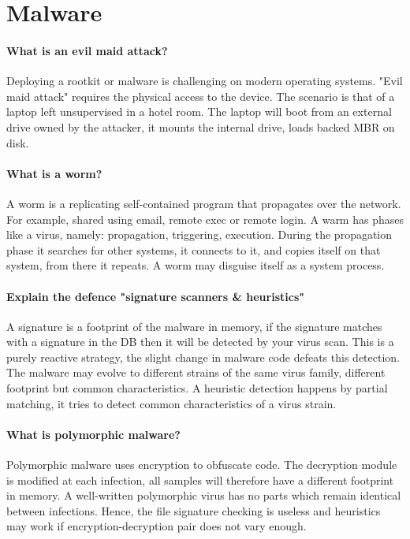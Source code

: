 \section{Malware}
\paragraph{What is an evil maid attack?}
Deploying a rootkit or malware is challenging on modern operating systems. "Evil maid attack" requires the physical access to the device. The scenario is that of a laptop left unsupervised in a hotel room. The laptop will boot from an external drive owned by the attacker, it mounts the internal drive, loads backed MBR on disk. 

\paragraph{What is a worm?}
A worm is a replicating self-contained program that propagates over the network. For example, shared using email, remote exec or remote login. A warm has phases like a virus, namely: propagation, triggering, execution. During the propagation phase it searches for other systems, it connects to it, and copies itself on that system, from there it repeats. A worm may disguise itself as a system process.

\paragraph{Explain the defence "signature scanners \& heuristics"}
A signature is a footprint of the malware in memory, if the signature matches with a signature in the DB then it will be detected by your virus scan. This is a purely reactive strategy, the slight change in malware code defeats this detection. The malware may evolve to different strains of the same virus family, different footprint but common characteristics. A heuristic detection happens by partial matching, it tries to detect common characteristics of a virus strain.

\paragraph{What is polymorphic malware?}
Polymorphic malware uses encryption to obfuscate code. The decryption module is modified at each infection, all samples will therefore have a different footprint in memory. A well-written polymorphic virus has no parts which remain identical between infections. Hence, the file signature checking is useless and heuristics may work if encryption-decryption pair does not vary enough.


